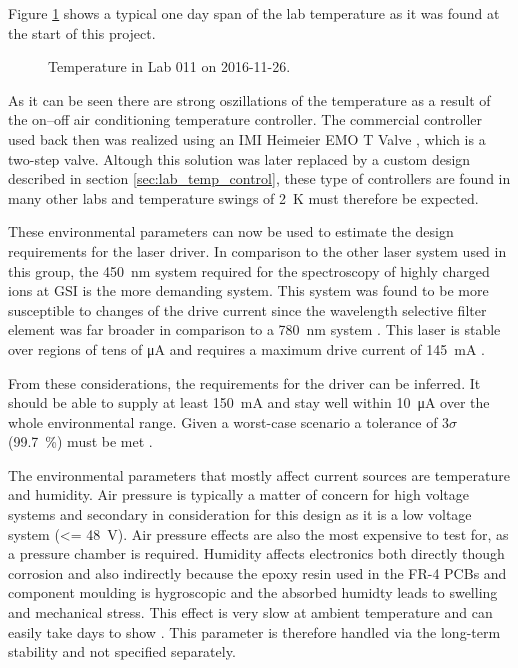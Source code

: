 Figure \ref{fig:lab_temperature_start_of_project} shows a typical one day span of the lab temperature as it was found at the start of this project.

\begin{figure}[ht]
    \centering
    
    \caption{Temperature in Lab 011 on 2016-11-26.}
    \label{fig:lab_temperature_start_of_project}
\end{figure}

As it can be seen there are strong oszillations of the temperature as a result of the on–off air conditioning temperature controller. The commercial controller used back then was realized using an IMI Heimeier EMO T Valve \cite{datasheet_heimeier_emo_t}, which is a two-step valve. Altough this solution was later replaced by a custom design described in section \ref{sec:lab_temp_control}, these type of controllers are found in many other labs and temperature swings of \qty{2}{\kelvin} must therefore be expected.

These environmental parameters can now be used to estimate the design requirements for the laser driver. In comparison to the other laser system used in this group, the \qty{450}{\nm} system \cite{thesis_baus} required for the spectroscopy of highly charged ions \cite{thesis_alex} at GSI is the more demanding system. This system was found to be more susceptible to changes of the drive current since the wavelength selective filter element was far broader in comparison to a \qty{780}{\nm} system \cite{two_filter_paper}. This laser is stable over regions of tens of \unit{\uA} and requires a maximum drive current of \qty{145}{\mA} \cite{datasheet_osram_pl450b}.

From these considerations, the requirements for the driver can be inferred. It should be able to supply at least \qty{150}{\mA} and stay well within \qty{10}{\uA} over the whole environmental range. Given a worst-case scenario a tolerance of $3\sigma$ (\qty{99.7}{\percent}) must be met \cite{worst_case_design}.

The environmental parameters that mostly affect current sources are temperature and humidity. Air pressure is typically a matter of concern for high voltage systems \cite{IPC-2221B} and secondary in consideration for this design as it is a low voltage system (\qty{<= 48}{\V}). Air pressure effects are also the most expensive to test for, as a pressure chamber is required. Humidity affects electronics both directly though corrosion and also indirectly because the epoxy resin used in the FR-4 PCBs and component moulding is hygroscopic and the absorbed humidty leads to swelling and mechanical stress. This effect is very slow at ambient temperature and can easily take days to show \cite{epoxy_humidity}. This parameter is therefore handled via the long-term stability and not specified separately.

